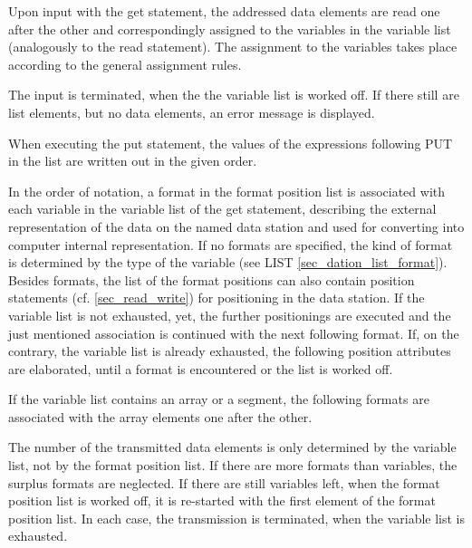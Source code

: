 




Upon input with the get statement, the addressed data elements are
read one after the other and correspondingly assigned to the variables
in the variable list (analogously to the read statement). The
assignment to the variables takes place according to the general
assignment rules.

The input is terminated, when the the variable list is worked off. If
there still are list elements, but no data elements, an error message is
displayed.

When executing the put statement, the values of the expressions
following PUT in the list are written out in the given order.

In the order of notation, a format in the format position list is
associated with each variable in the variable list of the get
statement, describing the external representation of the data on the
named data station and used for converting into computer internal
representation. 
If no formats are specified, the kind of format is determined by the
type of the variable (see LIST \ref{sec_dation_list_format}).
Besides formats, the list of the format positions can also
contain position statements (cf. \ref{sec_read_write})
for positioning in the data
station. If the variable list is not exhausted, yet, the further
positionings are executed and the just mentioned association is
continued with the next following format. If, on the contrary, the
variable list is already exhausted, the following position attributes
are elaborated, until a format is encountered or the list is worked off.

If the variable list contains an array or a segment, the following
formats are associated with the array elements one after the other.

The number of the transmitted data elements is only determined by the
variable list, not by the format position list. If there are more
formats than variables, the surplus formats are neglected. If there are
still variables left, when the format position list is worked off, it is
re-started with the first element of the format position list. In each
case, the transmission is terminated, when the variable list is
exhausted.

